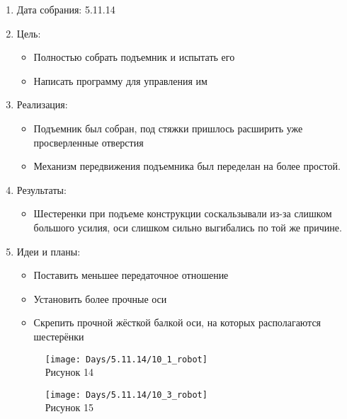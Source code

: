 
	\begin{enumerate}
		\item Дата собрания: 5.11.14
		\item Цель:
		\begin{itemize}
			\item Полностью собрать подъемник и испытать его
			\item Написать программу для управления им
		\end{itemize}			
		\item Реализация:
		\begin{itemize}
			\item Подъемник был собран, под стяжки пришлось расширить уже просверленные отверстия
			\item Механизм передвижения подъемника был переделан на более простой.
		\end{itemize}
		\item Результаты:
		\begin{itemize}
			\item Шестеренки при подъеме конструкции соскальзывали из-за слишком большого усилия, оси слишком сильно выгибались по той же причине.
		\end{itemize}
		\item Идеи и планы:
		\begin{itemize}
			\item Поставить меньшее передаточное отношение
			\item Установить более прочные оси
			\item Скрепить прочной жёсткой балкой оси, на которых располагаются шестерёнки
		\end{itemize}
		\begin{figure} [h]
			\centering
			\begin{minipage}{0.3\linewidth}
				\texttt{[image: Days/5.11.14/10\_1\_robot]}\\ Рисунок 14
			\end{minipage}
			\begin{minipage}{0.3\linewidth}
				\texttt{[image: Days/5.11.14/10\_3\_robot]}\\ Рисунок 15
			\end{minipage}
		\end{figure}
	\end{enumerate}
\fillpage